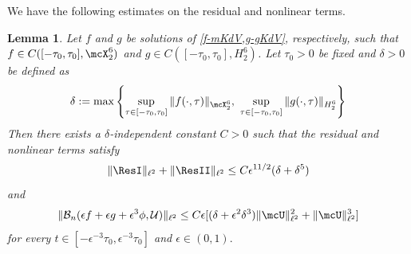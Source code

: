 \documentclass[oneside,reqno]{amsart}
\newtheorem{lem}{Lemma}[section]
\begin{document}
We have the following estimates on the residual and nonlinear terms.
\begin{lem}\label{residual-nonlinearity-bounds}
	Let \(f\) and \(g\) be solutions of \cref{f-mKdV,g-gKdV}, respectively, such that \(f\in C([-\tau_0, \tau_0] , \mcX^6_2)\) and \(g\in C([-\tau_0,\tau_0], H^6_2)\). Let \(\tau_0 > 0\) be fixed and \(\delta>0\) be defined as \begin{equation}\label{delta-defn}
		\delta := \max \left\{\sup_{\tau\in[-\tau_0, \tau_0]}\|f(\cdot,\tau)\|_{\mcX^6_2},\ \sup_{\tau\in[-\tau_0, \tau_0]} \|g(\cdot, \tau)\|_{H^6_2} \right\}
	\end{equation}
	Then there exists a \(\delta\)-independent constant \(C>0\) such that the residual and nonlinear terms satisfy
	\begin{equation}\label{res-ineq}
		\| \ResI \|_{\ell^2} + \|\ResII \|_{\ell^2} \leq C \epsilon^{11/2} (\delta + \delta^5)
	\end{equation}
	and 
	\begin{equation}\label{nonlinear-ineq}
		\| \mathcal B_n(\epsilon f + \epsilon g + \epsilon^3 \phi, \mathcal U) \|_{\ell^2} \leq C\epsilon [ (\delta+\epsilon^2\delta^3) \|\mcU\|_{\ell^2} ^2 + \|\mcU\|_{\ell^2}^3]
	\end{equation}
	for every \(t\in[-\epsilon^{-3} \tau_0, \epsilon^{-3} \tau_0]\) and \(\epsilon \in (0,1).\)
\end{lem}
\end{document}
